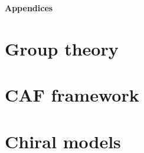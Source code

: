 \documentclass[11pt, a4paper]{book}
\numberwithin{equation}{chapter}
\begin{document}
\clearpage

\thispagestyle{empty} %
\vspace*{\fill}
\begin{center}
    \fontsize{50}{48}\selectfont\textbf{\textcolor{chaptercolour2}{Appendices}}
\end{center}
\vspace*{\fill}
\clearpage
\clearpage
\appendix
\chapter{Group theory}
\label{app:GT}

\chapter{CAF framework}
\label{app:CAF}

\chapter{Chiral models}
\label{app:models}

%
%
%
%
\end{document}
